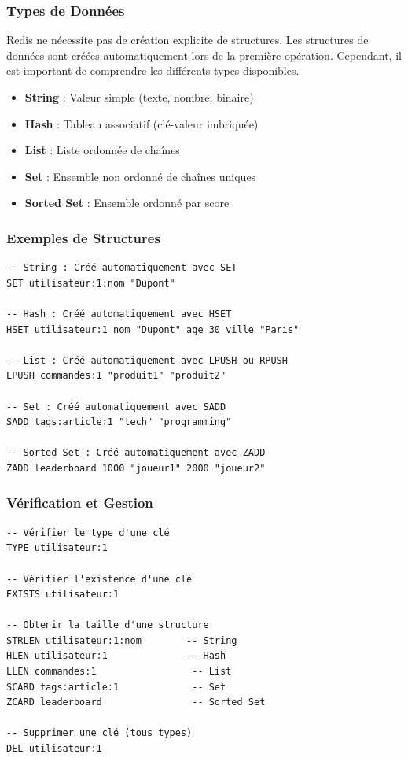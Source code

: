 \documentclass[11pt,a4paper]{article}
\begin{document}
\subsubsection{Types de Données}

\begin{astucebox}
Redis ne nécessite pas de création explicite de structures. Les structures de données sont créées automatiquement lors de la première opération. Cependant, il est important de comprendre les différents types disponibles.
\end{astucebox}

\begin{itemize}
    \item \textbf{String} : Valeur simple (texte, nombre, binaire)
    \item \textbf{Hash} : Tableau associatif (clé-valeur imbriquée)
    \item \textbf{List} : Liste ordonnée de chaînes
    \item \textbf{Set} : Ensemble non ordonné de chaînes uniques
    \item \textbf{Sorted Set} : Ensemble ordonné par score
\end{itemize}

\subsubsection{Exemples de Structures}

\begin{lstlisting}
-- String : Créé automatiquement avec SET
SET utilisateur:1:nom "Dupont"

-- Hash : Créé automatiquement avec HSET
HSET utilisateur:1 nom "Dupont" age 30 ville "Paris"

-- List : Créé automatiquement avec LPUSH ou RPUSH
LPUSH commandes:1 "produit1" "produit2"

-- Set : Créé automatiquement avec SADD
SADD tags:article:1 "tech" "programming"

-- Sorted Set : Créé automatiquement avec ZADD
ZADD leaderboard 1000 "joueur1" 2000 "joueur2"
\end{lstlisting}

\subsubsection{Vérification et Gestion}

\begin{lstlisting}
-- Vérifier le type d'une clé
TYPE utilisateur:1

-- Vérifier l'existence d'une clé
EXISTS utilisateur:1

-- Obtenir la taille d'une structure
STRLEN utilisateur:1:nom        -- String
HLEN utilisateur:1              -- Hash
LLEN commandes:1                 -- List
SCARD tags:article:1             -- Set
ZCARD leaderboard                -- Sorted Set

-- Supprimer une clé (tous types)
DEL utilisateur:1
\end{lstlisting}
\end{document}
